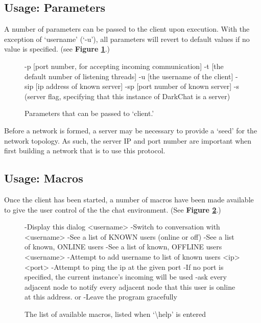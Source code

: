 \documentclass[11pt]{article}
\begin{document}
\subsection{Usage: Parameters}

A number of parameters can be passed to the client upon execution. With the exception of `username' (`-u'), all parameters will revert to default values if no value is specified. (see {\bf Figure \ref{params}}.)

\begin{figure}
\caption{Parameters that can be passed to `client.'}
\begin{code}
-p [port number, for accepting incoming communication]
-t [the default number of listening threads]
-u [the username of the client]
-sip [ip address of known server]
-sp [port number of known server]
-s (server flag, specifying that this instance of DarkChat is a server)
\end{code}
\label{params}
\end{figure}

Before a network is formed, a server may be necessary to provide a `seed' for the network topology. As such, the server IP and port number are important when first building a network that is to use this protocol.

\subsection{Usage: Macros}

Once the client has been started, a number of macros have been made available to give the user control of the the chat environment. (See {\bf Figure \ref{macros}}.)

\begin{figure}
\caption{The list of available macros, listed when `\textbackslash help' is entered}
\begin{code}
  \help
   -Display this dialog
  \chat <username>
   -Switch to conversation with <username>
  \users
   -See a list of KNOWN users (online or off)
  \online
   -See a list of known, ONLINE users
  \offline
   -See a list of known, OFFLINE users
  \add <username>
   -Attempt to add username to list of known users
  \ping <ip> <port>
   -Attempt to ping the ip at the given port
   -If no port is specified, the current instance's incoming will be used
  \explode
   -ask every adjacent node to notify every adjacent node that this user is 
    online at this address.
  \quit or \exit
   -Leave the program gracefully
\end{code}
\label{macros}
\end{figure}
\end{document}
